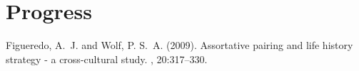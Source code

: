 \documentclass[pdftex, DIV=calc, paper=a4, fontsize=11pt, twocolumn]{scrartcl}	 %
\begin{document}
\lipsum[8]



\section*{Progress}

\lipsum[22]


\begin{thebibliography}{99} %

Figueredo, A.~J. and Wolf, P. S.~A. (2009).
\newblock Assortative pairing and life history strategy - a cross-cultural
  study.
, 20:317--330.
 
\end{thebibliography}

\end{document}
